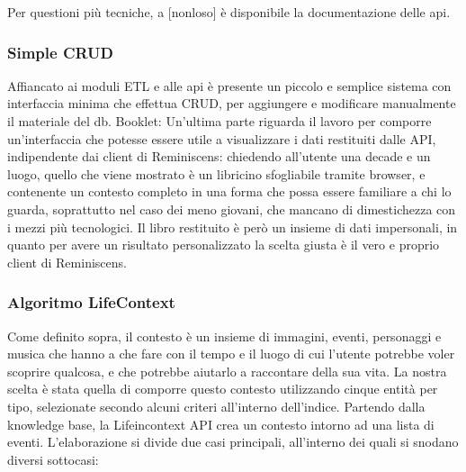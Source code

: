 \documentclass[sigproc-sp.tex]{subfiles}
\begin{document}
Per questioni più tecniche, a [nonloso] è disponibile la documentazione delle api.

\subsubsection{Simple CRUD}
Affiancato ai moduli ETL e alle api è presente un piccolo e semplice sistema con interfaccia minima che effettua CRUD, per aggiungere e modificare manualmente il materiale del db.
Booklet: Un’ultima parte riguarda il lavoro per comporre un’interfaccia che potesse essere utile a visualizzare i dati restituiti dalle API, indipendente dai client di Reminiscens: chiedendo all’utente una decade e un luogo, quello che viene mostrato è un libricino sfogliabile tramite browser, e contenente un contesto completo in una forma che possa essere familiare a chi lo guarda, soprattutto nel caso dei meno giovani, che mancano di dimestichezza con i mezzi più tecnologici. Il libro restituito è però un insieme di dati impersonali, in quanto per avere un risultato personalizzato la scelta giusta è il vero e proprio client di Reminiscens.

\subsubsection{Algoritmo LifeContext}
Come definito sopra, il contesto è un insieme di immagini, eventi, personaggi e musica che hanno a che fare con il tempo e il luogo di cui l’utente potrebbe voler scoprire qualcosa, e che potrebbe aiutarlo a raccontare della sua vita. La nostra scelta è stata quella di comporre questo contesto utilizzando cinque entità per tipo, selezionate secondo alcuni criteri all’interno dell’indice.
Partendo dalla knowledge base, la Lifeincontext API crea un contesto intorno ad una lista di eventi. L’elaborazione si divide due casi principali, all’interno dei quali si snodano diversi sottocasi:
\end{document}
